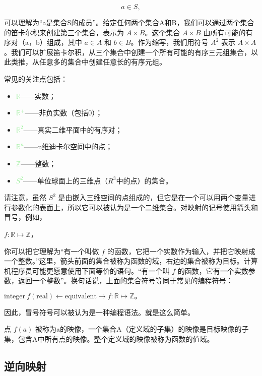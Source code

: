 \documentclass[lang=cn,12pt]{elegantbook}
\begin{document}
$$a \in S,$$ 

可以理解为“a是集合S的成员”。给定任何两个集合A和B，我们可以通过两个集合的笛卡尔积来创建第三个集合，表示为 $A \times B$。这个集合 $A \times B$ 由所有可能的有序对（a，b）组成，其中 $a \in A$ 和 $b \in B$。作为缩写，我们用符号 $A^2$ 表示 $A \times A$。我们可以扩展笛卡尔积，从三个集合中创建一个所有可能的有序三元组集合，以此类推，从任意多的集合中创建任意长的有序元组。

常见的关注点包括：

\begin{itemize}
  \item \textcolor{lightgreen}{$\mathbb{R}$}——实数；
  \item \textcolor{lightgreen}{$\mathbb{R^+}$}——非负实数（包括0）；
  \item \textcolor{lightgreen}{$\mathbb{R}^2$}——真实二维平面中的有序对；
  \item \textcolor{lightgreen}{$\mathbb{R}^n$}——n维迪卡尔空间中的点；
  \item \textcolor{lightgreen}{$\mathbb{Z}$}——整数；
  \item \textcolor{lightgreen}{$S^2$}——单位球面上的三维点（$R^3$中的点）的集合。
\end{itemize}

请注意，虽然 $S^2$ 是由嵌入三维空间的点组成的，但它是在一个可以用两个变量进行参数化的表面上，所以它可以被认为是一个二维集合。对映射的记号使用箭头和冒号，例如，
\begin{center}
  $f : \mathbb{R} \mapsto \mathbb{Z}$，
\end{center}

你可以把它理解为“有一个叫做 $f$ 的函数，它把一个实数作为输入，并把它映射成一个整数。”这里，箭头前面的集合被称为函数的域，右边的集合被称为目标。计算机程序员可能更愿意使用下面等价的语句。“有一个叫 $f$ 的函数，它有一个实数参数，返回一个整数”。换句话说，上面的集合符号等同于常见的编程符号：

\begin{center}
  $\text{integer} \  f(\text{real}) \leftarrow \text{equivalent} \rightarrow f : \mathbb{R} \mapsto \mathbb{Z}。$
\end{center}

因此，冒号符号可以被认为是一种编程语法。就是这么简单。

点 $f(a)$ 被称为a的映像，一个集合A（定义域的子集）的映像是目标映像的子集，包含A中所有点的映像。整个定义域的映像被称为函数的值域。

\subsection{逆向映射}
\end{document}

